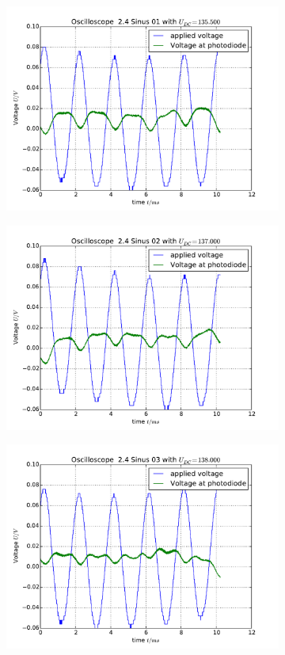 \begin{figure}
\begin{subfigure}[b]{\picwidth}
        \includegraphics[width=\textwidth]{analysis/figures/24sinus01}
        \caption{}
    \end{subfigure}
    \begin{subfigure}[b]{\picwidth}
        \includegraphics[width=\textwidth]{analysis/figures/24sinus02}
        \caption{}
    \end{subfigure}
    \begin{subfigure}[b]{\picwidth}
        \includegraphics[width=\textwidth]{analysis/figures/24sinus03}

\end{subfigure}
\end{figure}
